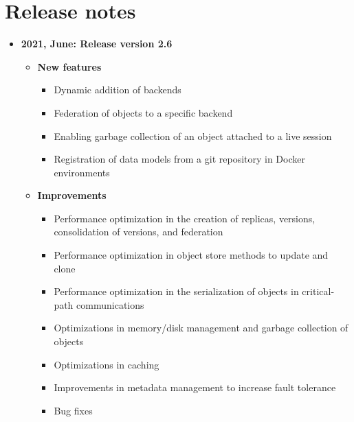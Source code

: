 \chapter*{Release notes}

\begin{itemize}
\item[] \textbf{2021, June: Release version 2.6}\newline
    \begin{itemize}
    \item[] \textbf{New features}
        \begin{itemize}
            \item[] Dynamic addition of backends
            \item[] Federation of objects to a specific backend
            \item[] Enabling garbage collection of an object attached to a live session
            \item[] Registration of data models from a git repository in Docker environments	
        \end{itemize}
    \item[] \textbf{Improvements}
        \begin{itemize}
            \item[] Performance optimization in the creation of replicas, versions, consolidation of versions, and federation 
            \item[] Performance optimization in object store methods to update and clone
            \item[] Performance optimization in the serialization of objects in critical-path communications
            \item[] Optimizations in memory/disk management and garbage collection of objects
            \item[] Optimizations in caching
            \item[] Improvements in metadata management to increase fault tolerance
            \item[] Bug fixes
        \end{itemize}
    \end{itemize}
\end{itemize}
